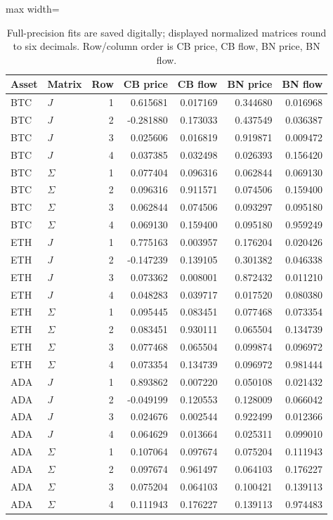 \begin{table}[htbp]
\centering\small
\caption{Full-precision fits are saved digitally; displayed normalized matrices round to six decimals. Row/column order is CB price, CB flow, BN price, BN flow.}\label{tab:joint_matrices_recovered}
\begin{adjustbox}{max width=\textwidth}
\begin{tabular}{llrrrrr}\toprule
Asset & Matrix & Row & CB price & CB flow & BN price & BN flow\\\midrule
BTC & $J$ & 1 & 0.615681 & 0.017169 & 0.344680 & 0.016968\\
BTC & $J$ & 2 & -0.281880 & 0.173033 & 0.437549 & 0.036387\\
BTC & $J$ & 3 & 0.025606 & 0.016819 & 0.919871 & 0.009472\\
BTC & $J$ & 4 & 0.037385 & 0.032498 & 0.026393 & 0.156420\\
BTC & $\Sigma$ & 1 & 0.077404 & 0.096316 & 0.062844 & 0.069130\\
BTC & $\Sigma$ & 2 & 0.096316 & 0.911571 & 0.074506 & 0.159400\\
BTC & $\Sigma$ & 3 & 0.062844 & 0.074506 & 0.093297 & 0.095180\\
BTC & $\Sigma$ & 4 & 0.069130 & 0.159400 & 0.095180 & 0.959249\\
ETH & $J$ & 1 & 0.775163 & 0.003957 & 0.176204 & 0.020426\\
ETH & $J$ & 2 & -0.147239 & 0.139105 & 0.301382 & 0.046338\\
ETH & $J$ & 3 & 0.073362 & 0.008001 & 0.872432 & 0.011210\\
ETH & $J$ & 4 & 0.048283 & 0.039717 & 0.017520 & 0.080380\\
ETH & $\Sigma$ & 1 & 0.095445 & 0.083451 & 0.077468 & 0.073354\\
ETH & $\Sigma$ & 2 & 0.083451 & 0.930111 & 0.065504 & 0.134739\\
ETH & $\Sigma$ & 3 & 0.077468 & 0.065504 & 0.099874 & 0.096972\\
ETH & $\Sigma$ & 4 & 0.073354 & 0.134739 & 0.096972 & 0.981444\\
ADA & $J$ & 1 & 0.893862 & 0.007220 & 0.050108 & 0.021432\\
ADA & $J$ & 2 & -0.049199 & 0.120553 & 0.128009 & 0.066042\\
ADA & $J$ & 3 & 0.024676 & 0.002544 & 0.922499 & 0.012366\\
ADA & $J$ & 4 & 0.064629 & 0.013664 & 0.025311 & 0.099010\\
ADA & $\Sigma$ & 1 & 0.107064 & 0.097674 & 0.075204 & 0.111943\\
ADA & $\Sigma$ & 2 & 0.097674 & 0.961497 & 0.064103 & 0.176227\\
ADA & $\Sigma$ & 3 & 0.075204 & 0.064103 & 0.100421 & 0.139113\\
ADA & $\Sigma$ & 4 & 0.111943 & 0.176227 & 0.139113 & 0.974483\\
\bottomrule\end{tabular}
\end{adjustbox}
\end{table}


